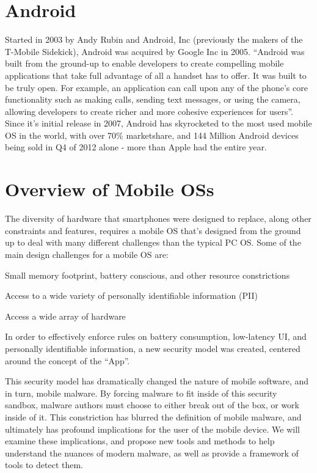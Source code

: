 \section{Android}
Started in 2003 by Andy Rubin and Android, Inc (previously the makers of the T-Mobile Sidekick), Android was acquired by Google Inc in 2005\citep{businessweek2005}. ``Android was built from the ground-up to enable developers to create compelling mobile applications that take full advantage of all a handset has to offer. It was built to be truly open. For example, an application can call upon any of the phone’s core functionality such as making calls, sending text messages, or using the camera, allowing developers to create richer and more cohesive experiences for users''\citep{ohaandroidoverview}. Since it's initial release in 2007\citep{oharelease2007}, Android has skyrocketed to the most used mobile OS in the world, with over 70\% marketshare, and 144 Million Android devices being sold in Q4 of 2012 alone\citep{gartnerq42012} - more than Apple had the entire year.


\section{Overview of Mobile OSs}
The diversity of hardware that smartphones were designed to replace, along other constraints and features, requires a mobile OS that's designed from the ground up to deal with many different challenges than the typical PC OS. Some of the main design challenges for a mobile OS are: 
\begin{smitemize}

\item Small memory footprint, battery conscious, and other resource constrictions

\item Access to a wide variety of personally identifiable information (PII)

\item Access a wide array of hardware

\end{smitemize}
In order to effectively enforce rules on battery consumption, low-latency UI, and personally identifiable information, a new security model was created, centered around the concept of the ``App''. 

This security model has dramatically changed the nature of mobile software, and in turn, mobile malware. By forcing malware to fit inside of this security sandbox, malware authors must choose to either break out of the box, or work inside of it. This constriction has blurred the definition of mobile malware, and ultimately has profound implications for the user of the mobile device. We will examine these implications, and propose new tools and methods to help understand the nuances of modern malware, as well as provide a framework of tools to detect them.

